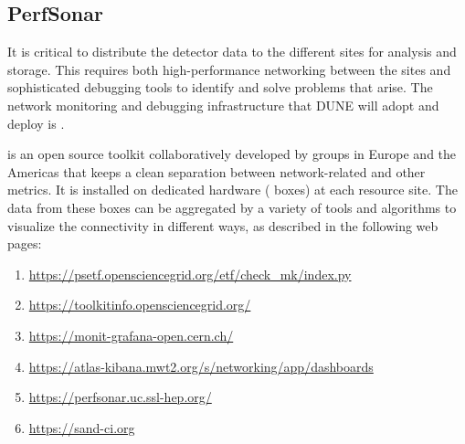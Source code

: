 \documentclass[../main-v1.tex]{subfiles}
\begin{document}


\subsection{PerfSonar}

It is critical to distribute the detector data to the different sites for analysis and storage. This requires both high-performance networking between the sites and sophisticated debugging tools to identify and solve problems that arise. The  network monitoring and debugging infrastructure that DUNE will adopt and deploy is .

 is an open source toolkit collaboratively developed by %
groups in Europe and the Americas that keeps a clean separation between network-related and other metrics. %
It is installed on dedicated hardware ( boxes) at %
each resource site. %
The data from these  boxes %
can be aggregated by a variety of tools and algorithms to %
visualize the connectivity in different ways, as described in the following web pages: %
\begin{enumerate}
    \item \url{https://psetf.opensciencegrid.org/etf/check_mk/index.py}
    \item \url{https://toolkitinfo.opensciencegrid.org/}
    \item \url{https://monit-grafana-open.cern.ch/}
    \item \url{https://atlas-kibana.mwt2.org/s/networking/app/dashboards}
    \item \url{https://perfsonar.uc.ssl-hep.org/}
    \item \url{https://sand-ci.org}
\end{enumerate}
\end{document}
